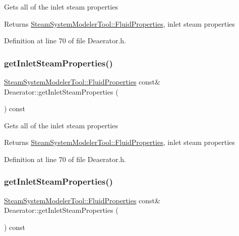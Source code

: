 Gets all of the inlet steam properties \begin{DoxyReturn}{Returns}
\hyperlink{struct_steam_system_modeler_tool_1_1_fluid_properties}{Steam\+System\+Modeler\+Tool\+::\+Fluid\+Properties}, inlet steam properties 
\end{DoxyReturn}


Definition at line 70 of file Deaerator.\+h.

\mbox{\label{class_deaerator_a7298fa1e4930e73dd5340411e8ccff33}} 
\subsubsection{\texorpdfstring{get\+Inlet\+Steam\+Properties()}{getInletSteamProperties()}\hspace{0.1cm}{\footnotesize\ttfamily [2/3]}}
{\footnotesize\ttfamily \hyperlink{struct_steam_system_modeler_tool_1_1_fluid_properties}{Steam\+System\+Modeler\+Tool\+::\+Fluid\+Properties} const\& Deaerator\+::get\+Inlet\+Steam\+Properties (\begin{DoxyParamCaption}{ }\end{DoxyParamCaption}) const\hspace{0.3cm}{\ttfamily [inline]}}

Gets all of the inlet steam properties \begin{DoxyReturn}{Returns}
\hyperlink{struct_steam_system_modeler_tool_1_1_fluid_properties}{Steam\+System\+Modeler\+Tool\+::\+Fluid\+Properties}, inlet steam properties 
\end{DoxyReturn}


Definition at line 70 of file Deaerator.\+h.

\mbox{\label{class_deaerator_a7298fa1e4930e73dd5340411e8ccff33}} 
\subsubsection{\texorpdfstring{get\+Inlet\+Steam\+Properties()}{getInletSteamProperties()}\hspace{0.1cm}{\footnotesize\ttfamily [3/3]}}
{\footnotesize\ttfamily \hyperlink{struct_steam_system_modeler_tool_1_1_fluid_properties}{Steam\+System\+Modeler\+Tool\+::\+Fluid\+Properties} const\& Deaerator\+::get\+Inlet\+Steam\+Properties (\begin{DoxyParamCaption}{ }\end{DoxyParamCaption}) const\hspace{0.3cm}{\ttfamily [inline]}}

